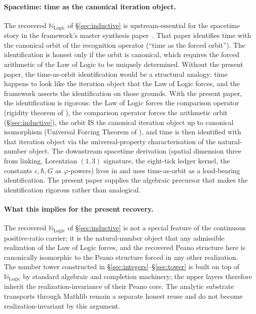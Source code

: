 \documentclass[11pt,a4paper]{article}
\theoremstyle{definition}
\theoremstyle{remark}
\begin{document}
\paragraph{Spacetime: time as the canonical iteration object.} The
recovered $\mathbb{N}_{\mathrm{Logic}}$ of \S\ref{sec:inductive} is
upstream-essential for the spacetime story in the framework's master
synthesis paper~\cite{Washburn2026RealityFromOneDistinction}. That
paper identifies time with the canonical orbit of the recognition
operator (``time as the forced orbit''). The identification is
honest only if the orbit is canonical, which requires the forced
arithmetic of the Law of Logic to be uniquely determined. Without
the present paper, the time-as-orbit identification would be a
structural analogy: time happens to look like the iteration object
that the Law of Logic forces, and the framework asserts the
identification on those grounds. With the present paper, the
identification is rigorous: the Law of Logic forces the comparison
operator (rigidity theorem of \cite{Washburn2026LogicFE}), the
comparison operator forces the arithmetic orbit
(\S\ref{sec:inductive}), the orbit IS the canonical iteration
object up to canonical isomorphism (Universal Forcing Theorem of
\cite{Washburn2026UniversalForcing}), and time is then identified
with that iteration object via the universal-property characterisation
of the natural-number object. The downstream spacetime derivation
(spatial dimension three from linking, Lorentzian $(1, 3)$ signature,
the eight-tick ledger kernel, the constants $c, \hbar, G$ as
$\varphi$-powers) lives in
\cite{Washburn2026RealityFromOneDistinction} and uses time-as-orbit
as a load-bearing identification. The present paper supplies the
algebraic precursor that makes the identification rigorous rather
than analogical.

\paragraph{What this implies for the present recovery.} The recovered
$\mathbb{N}_{\mathrm{Logic}}$ of \S\ref{sec:inductive} is not a
special feature of the continuous positive-ratio carrier; it is the
natural-number object that any admissible realization of the Law of
Logic forces, and the recovered Peano structure here is canonically
isomorphic to the Peano structure forced in any other realization.
The number tower constructed in
\S\ref{sec:integers}--\S\ref{sec:tower} is built on top of
$\mathbb{N}_{\mathrm{Logic}}$ by standard algebraic and completion
machinery; the upper layers therefore inherit the
realization-invariance of their Peano core. The analytic substrate
transports through Mathlib remain a separate honest reuse and do not
become realization-invariant by this argument.
\end{document}
